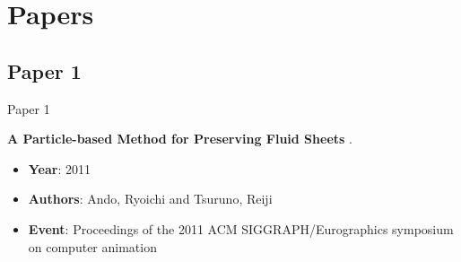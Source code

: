 \documentclass[10pt]{beamer}
\newcommand{\1}{
        	\setbeamertemplate{background}{
        		\texttt{[image: img/1]}
        		\tikz[overlay] \fill[fill opacity=0.75,fill=white] (0,0) rectangle (-\paperwidth,\paperheight);
        	}
}
\begin{document}
\section{Papers}


\subsection{Paper 1}

\begin{frame}{Paper 1}{}
	
	\begin{block}{}
		\centering
		\textbf{A Particle-based Method for Preserving Fluid Sheets} \cite{ando2011particle}.
	\end{block}

	\begin{itemize}
		\item \textbf{Year}: 2011
		\item \textbf{Authors}: Ando, Ryoichi and Tsuruno, Reiji
		\item \textbf{Event}: Proceedings of the 2011 ACM SIGGRAPH/Eurographics symposium on computer animation
	\end{itemize}
\end{frame}
\end{document}
